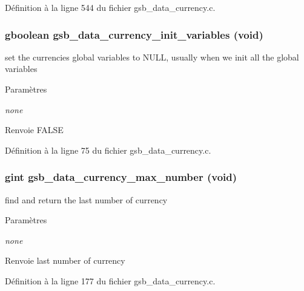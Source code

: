 Définition à la ligne 544 du fichier gsb\_\-data\_\-currency.c.

\subsubsection[{gsb\_\-data\_\-currency\_\-init\_\-variables}]{\setlength{\rightskip}{0pt plus 5cm}gboolean gsb\_\-data\_\-currency\_\-init\_\-variables (void)}\label{gsb__data__currency_8h_a9351bbd5fd673ac0a6ada56badaf82f7}
set the currencies global variables to NULL, usually when we init all the global variables


\begin{DoxyParams}{Paramètres}
\item[{\em none}]\end{DoxyParams}
\begin{DoxyReturn}{Renvoie}
FALSE 
\end{DoxyReturn}


Définition à la ligne 75 du fichier gsb\_\-data\_\-currency.c.

\subsubsection[{gsb\_\-data\_\-currency\_\-max\_\-number}]{\setlength{\rightskip}{0pt plus 5cm}gint gsb\_\-data\_\-currency\_\-max\_\-number (void)}\label{gsb__data__currency_8h_a7f028c9288699445b1173ca81a7471d4}
find and return the last number of currency


\begin{DoxyParams}{Paramètres}
\item[{\em none}]\end{DoxyParams}
\begin{DoxyReturn}{Renvoie}
last number of currency 
\end{DoxyReturn}


Définition à la ligne 177 du fichier gsb\_\-data\_\-currency.c.

